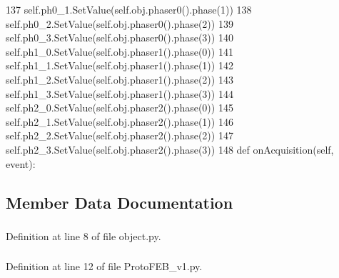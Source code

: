 \begin{DoxyCode}
137         self.ph0_1.SetValue(self.obj.phaser0().phase(1))
138         self.ph0_2.SetValue(self.obj.phaser0().phase(2))
139         self.ph0_3.SetValue(self.obj.phaser0().phase(3))
140         self.ph1_0.SetValue(self.obj.phaser1().phase(0))
141         self.ph1_1.SetValue(self.obj.phaser1().phase(1))
142         self.ph1_2.SetValue(self.obj.phaser1().phase(2))
143         self.ph1_3.SetValue(self.obj.phaser1().phase(3))
144         self.ph2_0.SetValue(self.obj.phaser2().phase(0))
145         self.ph2_1.SetValue(self.obj.phaser2().phase(1))
146         self.ph2_2.SetValue(self.obj.phaser2().phase(2))
147         self.ph2_3.SetValue(self.obj.phaser2().phase(3))
148 
    def onAcquisition(self, event):
\end{DoxyCode}


\subsection{Member Data Documentation}
\hypertarget{classobject_1_1object_a4fbaf843d1f40843b2c3895cb73ffada}{
\subsubsection[{cat}]{}}
\label{classobject_1_1object_a4fbaf843d1f40843b2c3895cb73ffada}


Definition at line 8 of file object.py.\hypertarget{classProtoFEB__v1_1_1ProtoFEB__v1_aaf44fb26138bd663c8d7faee3b2e94bf}{
\subsubsection[{modeCh}]{}}
\label{classProtoFEB__v1_1_1ProtoFEB__v1_aaf44fb26138bd663c8d7faee3b2e94bf}


Definition at line 12 of file ProtoFEB\_\-v1.py.\hypertarget{classobject_1_1object_a15f13858ecdbf661a97a7da93d717922}{
\subsubsection[{obj}]{}}
\label{classobject_1_1object_a15f13858ecdbf661a97a7da93d717922}



